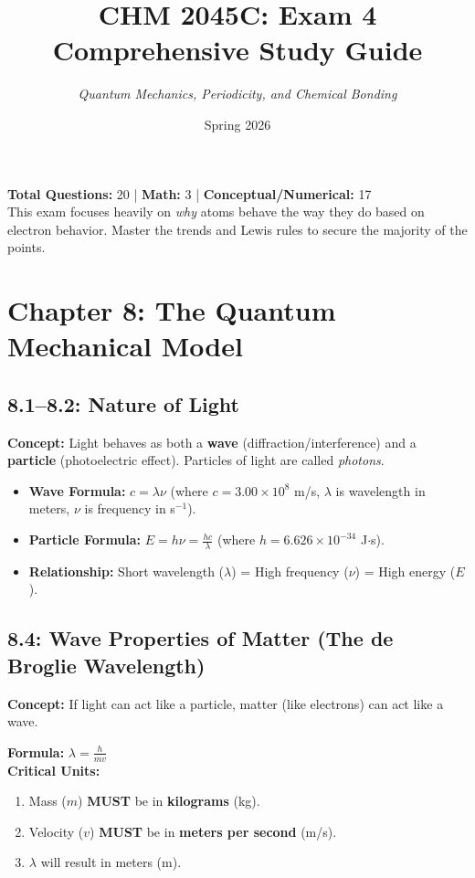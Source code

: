 \documentclass[11pt]{article}
\title{\Huge \textbf{CHM 2045C: Exam 4 Comprehensive Study Guide}}
\author{\Large \textit{Quantum Mechanics, Periodicity, and Chemical Bonding}}
\date{Spring 2026}
\begin{document}
\maketitle

\begin{center}
    \begin{tcolorbox}[colframe=chemblue, colback=white, width=0.8\textwidth, title=Exam Strategy]
        \textbf{Total Questions:} 20 | \textbf{Math:} 3 | \textbf{Conceptual/Numerical:} 17 \\
        This exam focuses heavily on \textit{why} atoms behave the way they do based on electron behavior. Master the trends and Lewis rules to secure the majority of the points.
    \end{tcolorbox}
\end{center}

\section{Chapter 8: The Quantum Mechanical Model}

\subsection{8.1--8.2: Nature of Light}
\textbf{Concept:} Light behaves as both a \textbf{wave} (diffraction/interference) and a \textbf{particle} (photoelectric effect). Particles of light are called \textit{photons}.
\begin{itemize}
    \item \textbf{Wave Formula:} $c = \lambda \nu$ (where $c = 3.00 \times 10^8$ m/s, $\lambda$ is wavelength in meters, $\nu$ is frequency in s$^{-1}$).
    \item \textbf{Particle Formula:} $E = h\nu = \frac{hc}{\lambda}$ (where $h = 6.626 \times 10^{-34}$ J$\cdot$s).
    \item \textbf{Relationship:} Short wavelength ($\lambda$) = High frequency ($\nu$) = High energy ($E$).
\end{itemize}

\subsection{8.4: Wave Properties of Matter (The de Broglie Wavelength)}
\textbf{Concept:} If light can act like a particle, matter (like electrons) can act like a wave.
\begin{tcolorbox}[colframe=chemblue!50, title=Mathematical Method: de Broglie Calculation]
    \textbf{Formula:} $\lambda = \frac{h}{m v}$ \\
    \textbf{Critical Units:} 
    \begin{enumerate}
        \item Mass ($m$) \textbf{MUST} be in \textbf{kilograms} (kg).
        \item Velocity ($v$) \textbf{MUST} be in \textbf{meters per second} (m/s).
        \item $\lambda$ will result in meters (m).
    \end{enumerate}
\end{tcolorbox}
\end{document}

